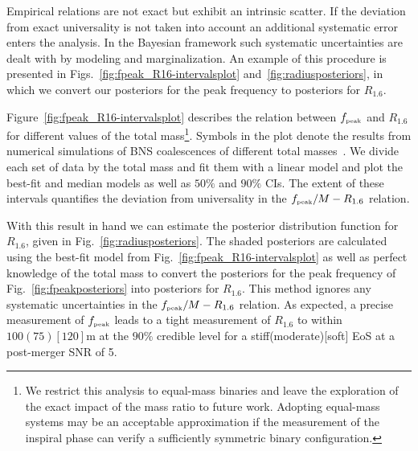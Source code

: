 \documentclass[aps,prd,amsmath,floats,floatfix, twocolumn,
superscriptaddress,nofootinbib,showpacs]{revtex4-1}
\newcommand{\peak}{{\mbox{\tiny peak}}}
\begin{document}
Empirical relations are not exact but exhibit an intrinsic scatter. If the deviation from exact universality is not taken into account an additional systematic error enters the analysis. In the Bayesian framework such systematic uncertainties are dealt with by modeling and marginalization. An example of this procedure is presented in Figs.~\ref{fig:fpeak_R16-intervalsplot} and~\ref{fig:radiusposteriors}, in which we convert our posteriors for the peak frequency to posteriors for $R_{1.6}$. 

Figure~\ref{fig:fpeak_R16-intervalsplot} describes the relation between $f_{\peak}$ and $R_{1.6}$ for different values of the total mass\footnote{We restrict this analysis to equal-mass binaries and leave the exploration of the exact impact of the mass ratio to future work. Adopting equal-mass systems may be an acceptable approximation if the measurement of the inspiral phase can verify a sufficiently symmetric binary configuration.}.  Symbols in the plot denote the results from numerical simulations of BNS coalescences of different total masses~\cite{bauswein:12,bauswein:14,bauswein:july15}. We divide each set of data by the total mass and fit them with a linear model and plot the best-fit and median models as well as $50\%$ and $90\%$ CIs. The extent of these intervals quantifies the deviation from universality in the $f_{\peak}/M-R_{1.6}$ relation.

With this result in hand we can estimate the posterior distribution function for $R_{1.6}$, given in Fig.~\ref{fig:radiusposteriors}. The shaded posteriors are calculated using the best-fit model from Fig.~\ref{fig:fpeak_R16-intervalsplot} as well as perfect knowledge of the total mass to convert the posteriors for the peak frequency of Fig.~\ref{fig:fpeakposteriors} into posteriors for $R_{1.6}$. This method ignores any systematic uncertainties in the $f_{\peak}/M-R_{1.6}$ relation. As expected, a precise measurement of $f_{\peak}$ leads to a tight measurement of $R_{1.6}$ to within $100(75)[120]$m at the $90\%$ credible level for a stiff(moderate)[soft] EoS at a post-merger SNR of 5.
\end{document}
